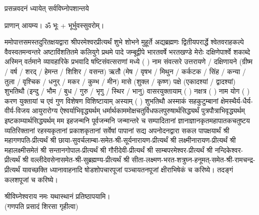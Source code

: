 
\setlength{\parindent}{0pt}

% 


{प्रसन्नवदनं ध्यायेत् सर्वविघ्नोपशान्तये}

प्राणान् आयम्य। ॐ भूः + भूर्भुवस्सुवरोम्।


ममोपात्तसमस्तदुरितक्षयद्वारा श्रीपरमेश्वरप्रीत्यर्थं शुभे शोभने मुहूर्ते अद्यब्रह्मणः
द्वितीयपरार्द्धे श्वेतवराहकल्पे वैवस्वतमन्वन्तरे अष्टाविंशतितमे कलियुगे प्रथमे पादे
जम्बूद्वीपे भारतवर्षे भरतखण्डे मेरोः दक्षिणेपार्श्वे शकाब्दे अस्मिन् वर्तमाने व्यावहारिके
प्रभवादि षष्टिसंवत्सराणां मध्ये (	) नाम संवत्सरे उत्तरायणे / दक्षिणायने 
(ग्रीष्म / वर्ष / शरद् / हेमन्त / शिशिर / वसन्त) ऋतौ (मेष / वृषभ / मिथुन / कर्कटक / सिंह / कन्या / तुला / 
वृश्चिक / धनुर् / मकर / कुम्भ / मीन) मासे (शुक्ल / कृष्ण) पक्षे (एकादश्यां / द्वादश्यां) शुभतिथौ
(इन्दु / भौम / बुध / गुरु / भृगु / स्थिर / भानु) वासरयुक्तायाम्
( ) नक्षत्र ( ) नाम योग ( ) करण युक्तायां च एवं गुण विशेषण विशिष्टायाम्
अस्याम् ( ) शुभतिथौ 
अस्माकं सहकुटुम्बानां क्षेमस्थैर्य-धैर्य-वीर्य-विजय आयुरारोग्य ऐश्वर्याभिवृद्ध्यर्थम्
धर्मार्थकाममोक्ष\-चतुर्विधफलपुरुषार्थसिद्ध्यर्थं पुत्रपौत्राभि\-वृद्ध्यर्थम् इष्टकाम्यार्थसिद्ध्यर्थम्
मम इहजन्मनि पूर्वजन्मनि जन्मान्तरे च सम्पादितानां ज्ञानाज्ञानकृतमहा\-पातकचतुष्टय
व्यतिरिक्तानां रहस्यकृतानां प्रकाशकृतानां सर्वेषां पापानां सद्य अपनोदनद्वारा सकल पापक्षयार्थं
श्री महागणपति-प्रीत्यर्थं श्री छाया-सुवर्चलाम्बा-समेत-श्री-सूर्यनारायण-प्रीत्यर्थं श्री लक्ष्मीनारायण-प्रीत्यर्थं 
श्री महालक्ष्मीसमेतं श्री सन्तानगोपाल-प्रीत्यर्थं श्री गौरीदेवी-प्रीत्यर्थं श्री साम्बपरमेश्वर-प्रीत्यर्थं श्री नन्दिकेश्वर-प्रीत्यर्थं 
श्री वल्लीदेवसेनासमेत-श्री-सुब्रह्मण्य-प्रीत्यर्थं श्री सीता-लक्ष्मण-भरत-शत्रुघ्न-हनूमत्-समेत-श्री-रामचन्द्र-प्रीत्यर्थं 
यावच्छक्ति ध्यानावाहनादि षोडशोपचारपूजां पञ्चायतनपूजां क्षीराभिषेकं च करिष्ये। तदङ्गं कलशपूजां च करिष्ये।


श्रीविघ्नेश्वराय नमः यथास्थानं प्रतिष्ठापयामि।\\
(गणपति प्रसादं शिरसा गृहीत्वा)







